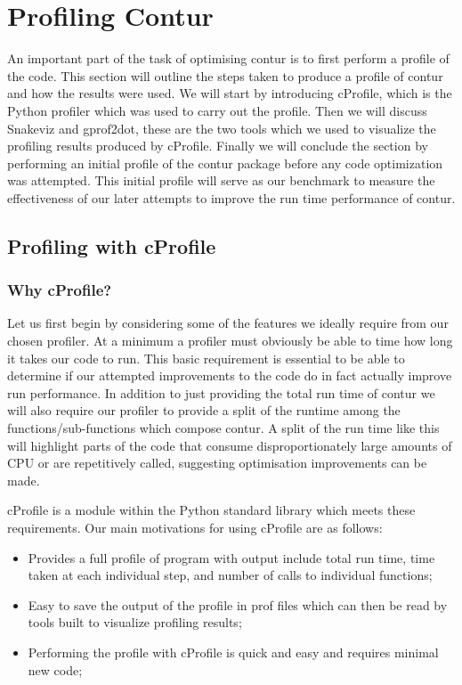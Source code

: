 \chapter{Profiling Contur}
\label{chapterlabel3}
An important part of the task of optimising contur is to first perform a profile of the code. This section will outline the steps taken to produce a profile of contur and how the results were used. We will start by introducing cProfile, which is the Python profiler which was used to carry out the profile. Then we will discuss Snakeviz and gprof2dot, these are the two tools which we used to visualize the profiling results produced by cProfile. Finally we will conclude the section by performing an initial profile of the contur package before any code optimization was attempted. This initial profile will serve as our benchmark to measure the effectiveness of our later attempts to improve the run time performance of contur.

\section{Profiling with cProfile}

\subsection{Why cProfile?}
Let us first begin by considering some of the features we ideally require from our chosen profiler. At a minimum a profiler must obviously be able to time how long it takes our code to run. This basic requirement is essential to be able to determine if our attempted improvements to the code do in fact actually improve run performance. In addition to just providing the total run time of contur we will also require our profiler to provide a split of the runtime among the functions/sub-functions which compose contur. A split of the run time like this will highlight parts of the code that consume disproportionately large amounts of CPU or are repetitively called, suggesting optimisation improvements can be made.

cProfile is a module within the Python standard library which meets these requirements. Our main motivations for using cProfile are as follows:

\begin{itemize}
\item Provides a full profile of program with output include total run time, time taken at each individual step, and number of calls to individual functions;
\item Easy to save the output of the profile in prof files which can then be read by tools built to visualize profiling results;
\item Performing the profile with cProfile is quick and easy and requires minimal new code;
\end{itemize}

